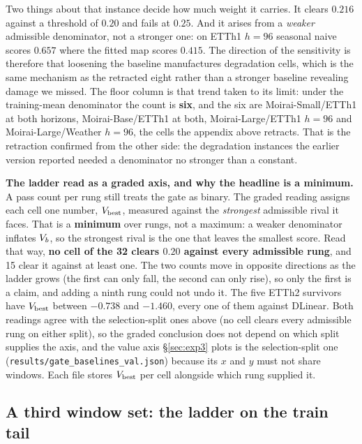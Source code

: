 Two things about that instance decide how much weight it carries.  It clears
$0.216$ against a threshold of $0.20$ and fails at $0.25$.  And it arises from a
\emph{weaker} admissible denominator, not a stronger one: on ETTh1 $h{=}96$
seasonal naive scores $0.657$ where the fitted map scores $0.415$.  The direction
of the sensitivity is therefore that loosening the baseline manufactures
degradation cells, which is the same mechanism as the retracted eight rather than
a stronger baseline revealing damage we missed.  The floor column is that trend
taken to its limit: under the training-mean denominator the count is
\textbf{six}, and the six are Moirai-Small/ETTh1 at both horizons,
Moirai-Base/ETTh1 at both, Moirai-Large/ETTh1 $h{=}96$ and Moirai-Large/Weather
$h{=}96$, the cells the appendix above retracts.  That is the retraction
confirmed from the other side: the degradation instances the earlier version
reported needed a denominator no stronger than a constant.

\textbf{The ladder read as a graded axis, and why the headline is a minimum.}  A
pass count per rung still treats the gate as binary.  The graded reading assigns
each cell one number, $V_{\text{best}}$, measured against the
\emph{strongest} admissible rival it faces.  That is a \textbf{minimum} over
rungs, not a maximum: a weaker denominator inflates $V_{b}$, so the
strongest rival is the one that leaves the smallest score.  Read that way,
\textbf{no cell of the 32 clears $0.20$ against every admissible rung}, and 15
clear it against at least one.  The two counts move in opposite directions as the
ladder grows (the first can only fall, the second can only rise), so only the
first is a claim, and adding a ninth rung could not undo it.  The five ETTh2
survivors have $V_{\text{best}}$ between $-0.738$ and $-1.460$, every
one of them against DLinear.  Both readings agree with the selection-split ones
above (no cell clears every admissible rung on either split), so the graded
conclusion does not depend on which split supplies the axis, and the value axis
\S\ref{sec:exp3} plots is the selection-split one
(\texttt{results/gate\_baselines\_val.json}) because its $x$ and $y$ must not
share windows.  Each file stores $V_{\text{best}}$ per cell alongside
which rung supplied it.

\subsection{A third window set: the ladder on the train tail}
\label{app:baselines:traintail}

